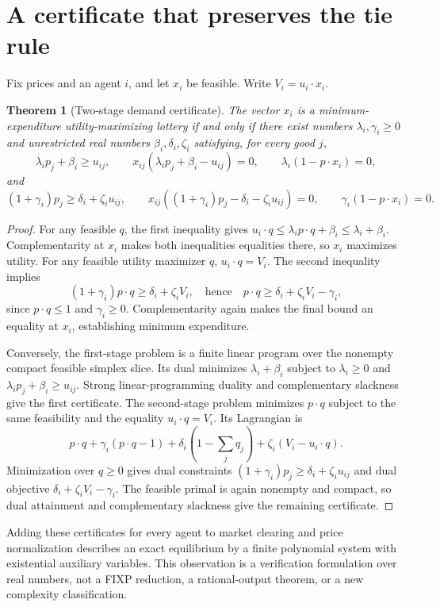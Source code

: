 \documentclass[11pt,a4paper]{article}
\newtheorem{theorem}{Theorem}[section]
\theoremstyle{definition}
\theoremstyle{remark}
\begin{document}
\section{A certificate that preserves the tie rule}
Fix prices and an agent $i$, and let $x_i$ be feasible. Write $V_i=u_i\cdot x_i$.
\begin{theorem}[Two-stage demand certificate]
The vector $x_i$ is a minimum-expenditure utility-maximizing lottery if and only if there exist numbers $\lambda_i,\gamma_i\ge0$ and unrestricted real numbers $\beta_i,\delta_i,\zeta_i$ satisfying, for every good $j$,
\[
 \lambda_i p_j+\beta_i\ge u_{ij},\qquad
 x_{ij}(\lambda_i p_j+\beta_i-u_{ij})=0,
 \qquad \lambda_i(1-p\cdot x_i)=0,
\]
and
\[
 (1+\gamma_i)p_j\ge\delta_i+\zeta_i u_{ij},\qquad
 x_{ij}((1+\gamma_i)p_j-\delta_i-\zeta_i u_{ij})=0,
 \qquad \gamma_i(1-p\cdot x_i)=0.
\]
\end{theorem}
\begin{proof}
For any feasible $q$, the first inequality gives
$u_i\cdot q\le\lambda_i p\cdot q+\beta_i\le\lambda_i+\beta_i$.
Complementarity at $x_i$ makes both inequalities equalities there, so $x_i$ maximizes utility.
For any feasible utility maximizer $q$, $u_i\cdot q=V_i$. The second inequality implies
\[
 (1+\gamma_i)p\cdot q\ge\delta_i+\zeta_iV_i,
 \quad\text{hence}\quad
 p\cdot q\ge\delta_i+\zeta_iV_i-\gamma_i,
\]
since $p\cdot q\le1$ and $\gamma_i\ge0$. Complementarity again makes the final bound an equality at $x_i$, establishing minimum expenditure.

Conversely, the first-stage problem is a finite linear program over the nonempty compact feasible simplex slice. Its dual minimizes $\lambda_i+\beta_i$ subject to $\lambda_i\ge0$ and $\lambda_i p_j+\beta_i\ge u_{ij}$. Strong linear-programming duality and complementary slackness give the first certificate. The second-stage problem minimizes $p\cdot q$ subject to the same feasibility and the equality $u_i\cdot q=V_i$. Its Lagrangian is
\[
 p\cdot q+\gamma_i(p\cdot q-1)
   +\delta_i(1-\textstyle\sum_jq_j)
   +\zeta_i(V_i-u_i\cdot q).
\]
Minimization over $q\ge0$ gives dual constraints
$(1+\gamma_i)p_j\ge\delta_i+\zeta_i u_{ij}$ and dual objective $\delta_i+\zeta_iV_i-\gamma_i$. The feasible primal is again nonempty and compact, so dual attainment and complementary slackness give the remaining certificate.
\end{proof}
Adding these certificates for every agent to market clearing and price normalization describes an exact equilibrium by a finite polynomial system with existential auxiliary variables. This observation is a verification formulation over real numbers, not a FIXP reduction, a rational-output theorem, or a new complexity classification.
\end{document}
